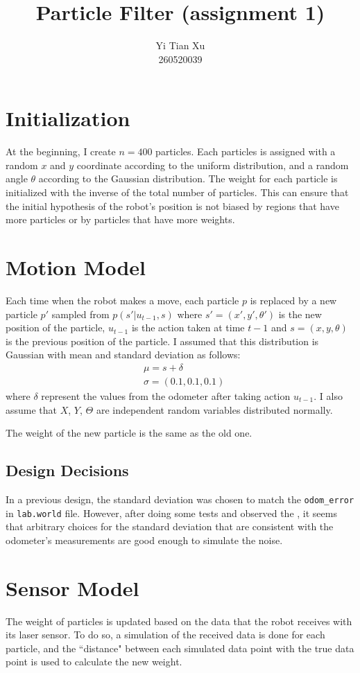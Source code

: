 \documentclass[10pt]{article}
\title{Particle Filter (assignment 1)}
\author{Yi Tian Xu\\260520039}
\begin{document}
\maketitle

\section{Initialization}
At the beginning, I create $n=400$ particles. Each particles is assigned with a random $x$ and $y$ coordinate according to the uniform distribution, and a random angle $\theta$ according to the Gaussian distribution. The weight for each particle is initialized with the inverse of the total number of particles. This can ensure that the initial hypothesis of the robot's position is not biased by regions that have more particles or by particles that have more weights. 

\section{Motion Model}
Each time when the robot makes a move, each particle $p$ is replaced by a new particle $p'$ sampled from $p(s'|u_{t-1}, s)$ where $s' = (x', y', \theta')$ is the new position of the particle, $u_{t-1}$ is the action taken at time $t-1$ and $s = (x, y, \theta)$ is the previous position of the particle. I assumed that this distribution is Gaussian with mean and standard deviation as follows:
\begin{align*}
	&\mu = s + \delta \\ 
	&\sigma = (0.1, 0.1, 0.1)
\end{align*}
where $\delta$ represent the values from the odometer after taking action $u_{t-1}$. I also assume that $X$, $Y$, $\Theta$ are independent random variables distributed normally. 

The weight of the new particle is the same as the old one. 

\subsection{Design Decisions}
In a previous design, the standard deviation was chosen to match the \texttt{odom\_error} in \texttt{lab.world} file. However, after doing some tests and observed the , it seems that arbitrary choices for the standard deviation that are consistent with the odometer's measurements are good enough to simulate the noise. 

\section{Sensor Model}
The weight of particles is updated based on the data that the robot receives with its laser sensor. To do so, a simulation of the received data is done for each particle, and the ``distance" between each simulated data point with the true data point is used to calculate the new weight. 
\end{document}
